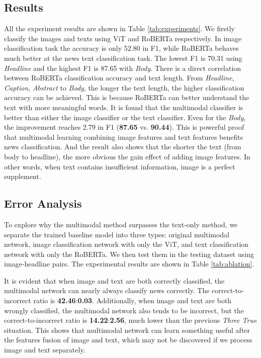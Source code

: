 \documentclass[10pt, a4paper]{article}
\begin{document}
\subsection{Results}

All the experiment results are shown in Table \ref{tab:experiments}. We firstly classify the images and texts using ViT and RoBERTa respectively. In image classification task the accuracy is only 52.80 in F1, while RoBERTa behaves much better at the news text classification task. The lowest F1 is 70.31 using \textit{Headline} and the highest F1 is 87.65 with \textit{Body}.
There is a direct correlation between RoBERTa classification accuracy and text length.
From \textit{Headline}, \textit{Caption}, \textit{Abstract} to \textit{Body}, the longer the text length, the higher classification accuracy can be achieved. This is because RoBERTa can better understand the text with more meaningful words.
It is found that the multimodal classifier is better than either the image classifier or the text classifier. Even for the \textit{Body}, the improvement reaches 2.79 in F1 (\textbf{87.65} vs. \textbf{90.44}).
This is powerful proof that multimodal learning combining image features and text features benefits news classification. And the result also shows that the shorter the text (from body to headline), the more obvious the gain effect of adding image features. In other words, when text contains insufficient information, image is a perfect supplement.

\subsection{Error Analysis}

To explore why the multimodal method surpasses the text-only method, we separate the trained baseline model into three types: original multimodal network, image classification network with only the ViT, and text classification network with only the RoBERTa. We then test them in the testing dataset using image-headline pairs. The experimental results are shown in Table \ref{tab:ablation}. 

It is evident that when image and text are both correctly classified, the multimodal network can nearly always classify news correctly. The correct-to-incorrect ratio is \textbf{42.46}:\textbf{0.03}. Additionally, when image and text are both wrongly classified, the multimodal network also tends to be incorrect, but the correct-to-incorrect ratio is \textbf{14.22}:\textbf{2.56}, much lower than the previous \textit{Three True} situation. This shows that multimodal network can learn something useful after the features fusion of image and text, which may not be discovered if we process image and text separately.
\end{document}
